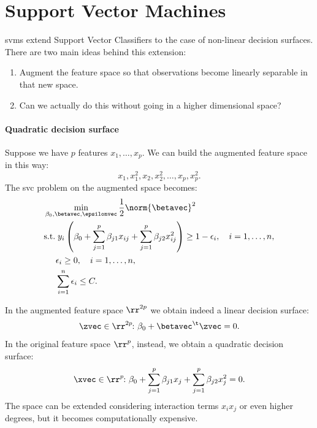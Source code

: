 \section{Support Vector Machines}

\acsp{svm} extend Support Vector Classifiers to the case of non-linear decision surfaces. There are two main ideas behind this extension:
\begin{enumerate}
    \item Augment the feature space so that observations become linearly separable in that new space.
    \item Can we actually do this without going in a higher dimensional space?
\end{enumerate}

\paragraph{Quadratic decision surface} Suppose we have $p$ features $x_1, \dots, x_p$. We can build the augmented feature space in this way:
\begin{equation}
    x_1, x_1^2, x_2, x_2^2, \dots, x_p, x_p^2.
\end{equation}
The \acs{svc} problem on the augmented space becomes:
\begin{equation}
    \begin{aligned}
         & \min_{\beta_0, \betavec, \epsilonvec} \frac{1}{2}\norm{\betavec}^2                                                                                        \\
         & \text{s.t.}\; y_i\left(\beta_0 + \sum_{j = 1}^{p}\beta_{j1}x_{ij} + \sum_{j = 1}^{p}\beta_{j2}x_{ij}^2\right) \geq 1 - \epsilon_i, \quad i = 1, \dots, n, \\
         & \phantom{s.t.} \epsilon_i \geq 0, \quad i = 1, \dots, n,                                                                                                  \\
         & \phantom{s.t.} \sum_{i=1}^n \epsilon_i \leq C.
    \end{aligned}
\end{equation}

In the augmented feature space $\rr^{2p}$ we obtain indeed a linear decision surface:
\begin{equation}
    \zvec \in \rr^{2p}\negthinspace\colon \beta_0 + \betavec^\t\zvec = 0.
\end{equation}
In the original feature space $\rr^p$, instead, we obtain a quadratic decision surface:
\begin{equation}
    \xvec \in \rr^p\negthinspace\colon \beta_0 + \sum_{j = 1}^{p}\beta_{j1}x_{j} + \sum_{j = 1}^{p}\beta_{j2}x_{j}^2 = 0.
\end{equation}
The space can be extended considering interaction terms $x_i x_j$ or even higher degrees, but it becomes computationally expensive.

